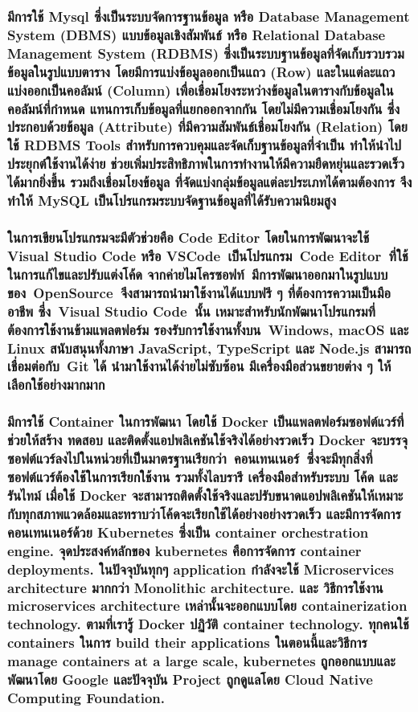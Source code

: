 \hspace{0cm}\subsubsection{มีการใช้ Mysql ซึ่งเป็นระบบจัดการฐานข้อมูล หรือ Database Management System (DBMS) แบบข้อมูลเชิงสัมพันธ์ หรือ Relational Database Management System (RDBMS) ซึ่งเป็นระบบฐานข้อมูลที่จัดเก็บรวบรวมข้อมูลในรูปแบบตาราง โดยมีการแบ่งข้อมูลออกเป็นแถว (Row) และในแต่ละแถวแบ่งออกเป็นคอลัมน์ (Column) เพื่อเชื่อมโยงระหว่างข้อมูลในตารางกับข้อมูลในคอลัมน์ที่กำหนด แทนการเก็บข้อมูลที่แยกออกจากกัน โดยไม่มีความเชื่อมโยงกัน ซึ่งประกอบด้วยข้อมูล (Attribute) ที่มีความสัมพันธ์เชื่อมโยงกัน (Relation) โดยใช้ RDBMS Tools สำหรับการควบคุมและจัดเก็บฐานข้อมูลที่จำเป็น ทำให้นำไปประยุกต์ใช้งานได้ง่าย ช่วยเพิ่มประสิทธิภาพในการทำงานให้มีความยืดหยุ่นและรวดเร็วได้มากยิ่งขึ้น รวมถึงเชื่อมโยงข้อมูล ที่จัดแบ่งกลุ่มข้อมูลแต่ละประเภทได้ตามต้องการ จึงทำให้ MySQL เป็นโปรแกรมระบบจัดฐานข้อมูลที่ได้รับความนิยมสูง \cite{sql}}

\clearpage

\hspace{0cm}\subsubsection{ในการเขียนโปรแกรมจะมีตัวช่วยคือ Code Editor โดยในการพัฒนาจะใช้ Visual Studio Code หรือ VSCode เป็นโปรแกรม Code Editor ที่ใช้ในการแก้ไขและปรับแต่งโค้ด จากค่ายไมโครซอฟท์ มีการพัฒนาออกมาในรูปแบบของ OpenSource จึงสามารถนำมาใช้งานได้แบบฟรี ๆ ที่ต้องการความเป็นมืออาชีพ ซึ่ง Visual Studio Code นั้น เหมาะสำหรับนักพัฒนาโปรแกรมที่ต้องการใช้งานข้ามแพลตฟอร์ม รองรับการใช้งานทั้งบน Windows, macOS และ Linux สนับสนุนทั้งภาษา JavaScript, TypeScript และ Node.js สามารถเชื่อมต่อกับ Git ได้ นำมาใช้งานได้ง่ายไม่ซับซ้อน มีเครื่องมือส่วนขยายต่าง ๆ ให้เลือกใช้อย่างมากมาก \cite{vscode}}

\hspace{0cm}\subsubsection{มีการใช้ Container ในการพัฒนา โดยใช้ Docker เป็นแพลตฟอร์มซอฟต์แวร์ที่ช่วยให้สร้าง ทดสอบ และติดตั้งแอปพลิเคชันใช้จริงได้อย่างรวดเร็ว Docker จะบรรจุซอฟต์แวร์ลงไปในหน่วยที่เป็นมาตรฐานเรียกว่า คอนเทนเนอร์ ซึ่งจะมีทุกสิ่งที่ซอฟต์แวร์ต้องใช้ในการเรียกใช้งาน รวมทั้งไลบรารี เครื่องมือสำหรับระบบ โค้ด และรันไทม์ เมื่อใช้ Docker จะสามารถติดตั้งใช้จริงและปรับขนาดแอปพลิเคชันให้เหมาะกับทุกสภาพแวดล้อมและทราบว่าโค้ดจะเรียกใช้ได้อย่างอย่างรวดเร็ว \cite{docker} และมีการจัดการคอนเทนเนอร์ด้วย Kubernetes ซึ่งเป็น container orchestration engine. จุดประสงค์หลักของ kubernetes คือการจัดการ container deployments. ในปัจจุบันทุกๆ application กำลังจะใช้ Microservices architecture มากกว่า Monolithic architecture. และ วิธีการใช้งาน microservices architecture เหล่านั้นจะออกแบบโดย containerization technology. ตามที่เรารู้ Docker ปฏิวัติ container technology. ทุกคนใช้ containers ในการ build their applications ในตอนนี้และวิธีการ manage containers at a large scale, kubernetes ถูกออกแบบและพัฒนาโดย Google และปัจจุบัน Project ถูกดูแลโดย Cloud Native Computing Foundation.\cite{kubernetes}}

